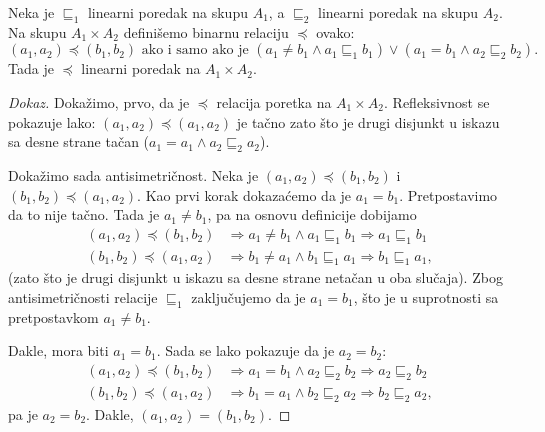 \begin{THM}\label{ft07.thm.lex-2}
  Neka je $\sqsubseteq_1$ linearni poredak na skupu $A_1$, a $\sqsubseteq_2$ linearni poredak na skupu $A_2$.
  Na skupu $A_1 \times A_2$ defini\v semo binarnu relaciju $\preccurlyeq$ ovako:
  $$
    (a_1, a_2) \preccurlyeq (b_1, b_2) \text{\ \ ako i samo ako je\ \ }
    (a_1 \ne b_1 \land a_1 \mathrel{\sqsubseteq_1} b_1) \lor (a_1 = b_1 \land a_2 \mathrel{\sqsubseteq_2} b_2).
  $$
  Tada je $\preccurlyeq$ linearni poredak na $A_1 \times A_2$.
\end{THM}
\begin{proof}[Dokaz]
  Doka\v zimo, prvo, da je $\preccurlyeq$ relacija poretka na $A_1 \times A_2$. Refleksivnost se pokazuje lako:
  $(a_1, a_2) \preccurlyeq (a_1, a_2)$ je ta\v cno zato \v sto je drugi disjunkt u iskazu sa desne strane ta\v can
  ($a_1 = a_1 \land a_2 \mathrel{\sqsubseteq_2} a_2$).
  
  \medskip
  
  Doka\v zimo sada antisimetri\v cnost. Neka je $(a_1, a_2) \preccurlyeq (b_1, b_2)$ i $(b_1, b_2) \preccurlyeq (a_1, a_2)$.
  Kao prvi korak dokaza\'cemo da je $a_1 = b_1$. Pretpostavimo da to nije ta\v cno. Tada je $a_1 \ne b_1$, pa na osnovu
  definicije dobijamo
  \begin{align*}
    (a_1, a_2) \preccurlyeq (b_1, b_2) &\Rightarrow a_1 \ne b_1 \land a_1 \mathrel{\sqsubseteq_1} b_1 \Rightarrow a_1 \mathrel{\sqsubseteq_1} b_1\\
    (b_1, b_2) \preccurlyeq (a_1, a_2) &\Rightarrow b_1 \ne a_1 \land b_1 \mathrel{\sqsubseteq_1} a_1 \Rightarrow b_1 \mathrel{\sqsubseteq_1} a_1,
  \end{align*}
  (zato \v sto je drugi disjunkt u iskazu sa desne strane neta\v can u oba slu\v caja). Zbog antisimetri\v cnosti relacije $\sqsubseteq_1$
  zaklju\v cujemo da je $a_1 = b_1$, \v sto je u suprotnosti sa pretpostavkom $a_1 \ne b_1$.
  
  Dakle, mora biti $a_1 = b_1$. Sada se lako pokazuje da je $a_2 = b_2$:
  \begin{align*}
    (a_1, a_2) \preccurlyeq (b_1, b_2) &\Rightarrow a_1 = b_1 \land a_2 \mathrel{\sqsubseteq_2} b_2 \Rightarrow a_2 \mathrel{\sqsubseteq_2} b_2\\
    (b_1, b_2) \preccurlyeq (a_1, a_2) &\Rightarrow b_1 = a_1 \land b_2 \mathrel{\sqsubseteq_2} a_2 \Rightarrow b_2 \mathrel{\sqsubseteq_2} a_2,
  \end{align*}
  pa je $a_2 = b_2$. Dakle, $(a_1, a_2) = (b_1, b_2)$.
  

\end{proof}
